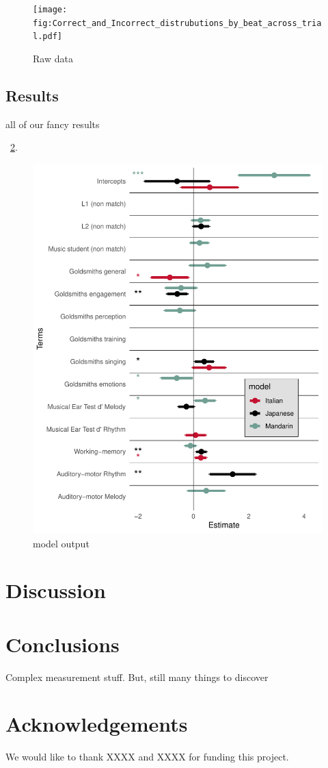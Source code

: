 \documentclass[a4paper]{article}
\begin{document}
\begin{figure}[t]
  \centering
  \texttt{[image: fig:Correct\_and\_Incorrect\_distrubutions\_by\_beat\_across\_trial.pdf]}
  \caption{Raw data}
  \label{fig:beat_data}
\end{figure}

\subsection{Results}

all of our fancy results

~\ref{fig:model}.

\begin{figure}[t]
  \centering
  \includegraphics[width=\linewidth]{SP_24_visuals/Japanese,Italian,_Mandarin_max_models_structure:_parsimonious_effects.pdf}
  \caption{model output}
  \label{fig:model}
\end{figure}

\section{Discussion}

\section{Conclusions}

Complex measurement stuff. But, still many things to discover

\section{Acknowledgements}

We would like to thank XXXX and XXXX for funding this project. \\




\end{document}
